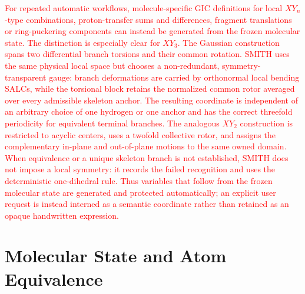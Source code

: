 \documentclass[journal=jctcce,manuscript=article,layout=traditional]{achemso}
\theoremstyle{definition}
\begin{document}
\textcolor{red}{For repeated automatic workflows, molecule-specific GIC
definitions for local \(XY_n\)-type combinations, proton-transfer sums and
differences, fragment translations or ring-puckering components can instead be
generated from the frozen molecular state.  The distinction is especially
clear for \(XY_3\).  The Gaussian construction spans two differential branch
torsions and their common rotation.\cite{Marenich2025GIC} SMITH uses the same
physical local space but chooses a non-redundant, symmetry-transparent gauge:
branch deformations are carried by orthonormal local bending SALCs, while the
torsional block retains the normalized common rotor averaged over every
admissible skeleton anchor.  The resulting coordinate is independent of an
arbitrary choice of one hydrogen or one anchor and has the correct threefold
periodicity for equivalent terminal branches.  The analogous \(XY_2\)
construction is restricted to acyclic centers, uses a twofold collective
rotor, and assigns the complementary in-plane and out-of-plane motions to the
same owned domain.  When equivalence or a unique skeleton branch is not
established, SMITH does not impose a local symmetry: it records the failed
recognition and uses the deterministic one-dihedral rule.  Thus variables that
follow from the frozen molecular state are generated and protected
automatically; an explicit user request is instead interned as a semantic
coordinate rather than retained as an opaque handwritten expression.}

\section{Molecular State and Atom Equivalence}
\end{document}
